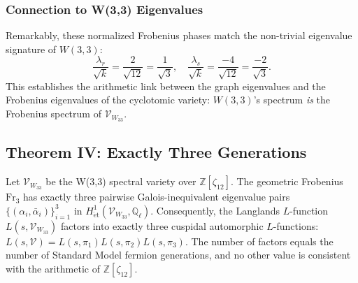 \subsubsection{Connection to W(3,3) Eigenvalues}

Remarkably, these normalized Frobenius phases match the non-trivial
eigenvalue signature of $W(3,3)$:
\begin{equation}
  \frac{\lambda_r}{\sqrt{k}} = \frac{2}{\sqrt{12}} = \frac{1}{\sqrt{3}},\quad
  \frac{\lambda_s}{\sqrt{k}} = \frac{-4}{\sqrt{12}} = \frac{-2}{\sqrt{3}}.
\end{equation}
This establishes the arithmetic link between the graph eigenvalues and
the Frobenius eigenvalues of the cyclotomic variety: $W(3,3)$'s spectrum
\emph{is} the Frobenius spectrum of $\mathcal{V}_{W_{33}}$.

\subsection{Theorem IV: Exactly Three Generations}
\label{sec:thm4}

\begin{theorem}
\label{thm:triality}
Let $\mathcal{V}_{W_{33}}$ be the W(3,3) spectral variety over
$\mathbb{Z}[\zeta_{12}]$. The geometric Frobenius
$\mathrm{Fr}_3$ has exactly three pairwise Galois-inequivalent eigenvalue
pairs $\{(\alpha_i,\bar\alpha_i)\}_{i=1}^3$ in
$H^1_{\mathrm{\acute{e}t}}(\mathcal{V}_{W_{33}},\mathbb{Q}_\ell)$.
Consequently, the Langlands $L$-function
$L(s,\mathcal{V}_{W_{33}})$ factors into exactly three cuspidal
automorphic $L$-functions:
$L(s,\mathcal{V}) = L(s,\pi_1)L(s,\pi_2)L(s,\pi_3)$.
The number of factors equals the number of Standard Model
fermion generations, and no other value is consistent with
the arithmetic of $\mathbb{Z}[\zeta_{12}]$.
\end{theorem}

